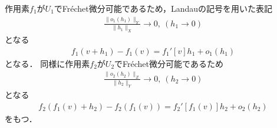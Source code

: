 \begin{Proof}
作用素$f_1$が$U_1$でFr\'echet微分可能であるため，Landauの記号を用いた表記
\begin{align*}
  \frac{\| o_1( h_1 ) \|_{Y}  }{ \| h_1 \|_{X} } \rightarrow 0, ~ (h_1 \rightarrow 0)
\end{align*}
となる
\begin{align*}
  f_1(v + h_1) - f_1(v) =  f_1'[v] h_1 + o_1( h_1 )
\end{align*}
となる．
同様に作用素$f_2$が$U_2$でFr\'echet微分可能であるため
\begin{align*}
  \frac{\| o_2( h_2 ) \|_{Z}  }{ \| h_2 \|_{Y} } \rightarrow 0, ~ (h_2 \rightarrow 0)
\end{align*}
となる
\begin{align*}
  f_2( f_1(v) + h_2 ) - f_2( f_1(v) ) =  f_2'[ f_1(v) ] h_2 + o_2( h_2 )
\end{align*}
をもつ．


\end{Proof}
